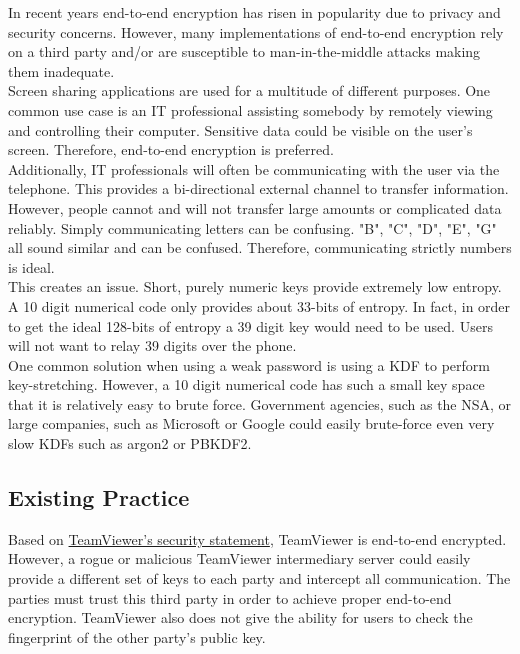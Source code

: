 \documentclass{article}
\begin{document}
    In recent years end-to-end encryption has risen in popularity due to privacy and
    security concerns. However, many implementations of end-to-end encryption rely
    on a third party and/or are susceptible to man-in-the-middle attacks making them
    inadequate.\\

    Screen sharing applications are used for a multitude of different purposes. One
    common use case is an IT professional assisting somebody by remotely viewing and
    controlling their computer. Sensitive data could be visible on the user's
    screen. Therefore, end-to-end encryption is preferred.\\

    Additionally, IT professionals will often be communicating with the user via the
    telephone. This provides a bi-directional external channel to transfer
    information. However, people cannot and will not transfer large amounts or
    complicated data reliably. Simply communicating letters can be confusing. "B",
    "C", "D", "E", "G" all sound similar and can be confused. Therefore,
    communicating strictly numbers is ideal.\\

    This creates an issue. Short, purely numeric keys provide extremely low entropy.
    A 10 digit numerical code only provides about 33-bits of entropy. In fact, in
    order to get the ideal 128-bits of entropy a 39 digit key would need to be used.
    Users will not want to relay 39 digits over the phone.\\

    One common solution when using a weak password is using a KDF to perform
    key-stretching. However, a 10 digit numerical code has such a small key space
    that it is relatively easy to brute force. Government agencies, such as the NSA,
    or large companies, such as Microsoft or Google could easily brute-force even
    very slow KDFs such as argon2 or PBKDF2.\\

    \subsection{Existing Practice}

    Based on \href{https://static.teamviewer.com/resources/2017/07/TeamViewer-Security-Statement-en.pdf}{TeamViewer's security statement},
    TeamViewer is end-to-end encrypted. However, a rogue or malicious TeamViewer
    intermediary server could easily provide a different set of keys to each party
    and intercept all communication. The parties must trust this third party in
    order to achieve proper end-to-end encryption. TeamViewer also does not give the
    ability for users to check the fingerprint of the other party's public key.\\
\end{document}

